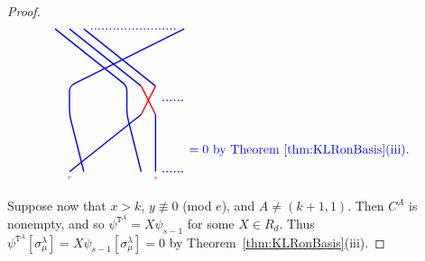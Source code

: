 \documentclass[twoside,11pt,reqno,letter]{amsart}
\numberwithin{equation}{section}
\theoremstyle{definition}  %
\newcommand{\0}{{\bar 0}}
\newcommand{\1}{{\bar 1}}
\newcommand{\la}{\lambda}
\newcommand{\si}{\sigma}
\def\T{{\mathtt T}}
\newenvironment{braid}{%
  \begin{tikzpicture}[baseline=6mm,blue,line width=1pt, scale=0.4,
                      draw/.append style={rounded corners},
                      every node/.append style={font=\tiny}]%
  }{\end{tikzpicture}
}
\begin{document}
{\begin{proof}
\[\begin{braid}
    \draw(4,10)--(9,6)--(9,4)--(10,0);
    \draw(5,10)--(10,6);
      \draw[color=red](10,6)--(11,4);
      \draw(11,4)--(11,0)node[below, color=red]{$s$};
    \draw(6,10)--(11,6);
      \draw[color=red](11,6)--(10,4);
      \draw(10,4)--(5,0)node[below, color=red]{$r$};

    \draw[dotted](6.5,10)--(12.5,10);

    \draw(13,10)--(5,6)--(5,4)--(6,0);

    \draw[dotted](11.5,5)--(13,5);
    \draw[dotted](11.5,0)--(13,0);
  \end{braid}
  \begin{braid}\tikzset{scale=0.6,baseline=12mm}
    \draw(0,5)node[font=\normalsize]{$=0$ by Theorem~\ref{thm:KLRonBasis}(iii).};
  \end{braid}
\]






  Suppose now that $x > k$, $y \not \equiv 0$ (mod $e$), and $A \neq (k+1, 1)$. Then $C^A$ is nonempty, and so $\psi^{\T^A}=X \psi_{s-1}$ for some $X \in R_d$. Thus $\psi^{\T^A} [\si^\la_\mu] = X \psi_{s-1} [\si^\la_\mu] = 0$ by Theorem~\ref{thm:KLRonBasis}(iii).
\iffalse
\[
  \begin{braid}\tikzset{scale=0.6,baseline=12mm}
    \draw[dotted](0,10)--(0.5,10);
    \draw[dotted](0,6)--(4.5,6);
    \draw[dotted](0,4)--(7.5,4);
    \draw[dotted](0,2)--(7.5,2);

    \draw(1,10)--(5,6); \draw(5,-1)node[color=red]{$r$};

    \draw[dotted](1.5,10)--(3.5,10);
    \draw[dotted](5.5,6)--(7.5,6);

    \draw(4,10)--(8,6);
      \draw[color=red](8,4)--(9,2); \draw(9,-1)node[color=red]{$s$};
    \draw(5,10)--(9,6);
      \draw[color=red](9,4)--(8,2);

    \draw[dotted](5.5,10)--(11,10);
    \draw[dotted](9.5,6)--(11,6);
    \draw[dotted](9.5,4)--(11,4);
    \draw[dotted](9.5,2)--(11,2);

    \draw[dotted](0,1)--(11,1);
    \draw[dotted](0,0)--(11,0);

    \draw(-1,8)node[left,font=\normalsize]{$$};
    \draw(-1,2)node[left,font=\normalsize]{$\psi^{\T^A}$};
  \end{braid}
  \begin{braid}\tikzset{scale=0.6,baseline=12mm}
    \draw(0,5)node[font=\normalsize]{$=0$ by Theorem~\ref{thm:KLRonBasis}(iii).};
  \end{braid}
\]
\fi




\end{proof}}
\end{document}
